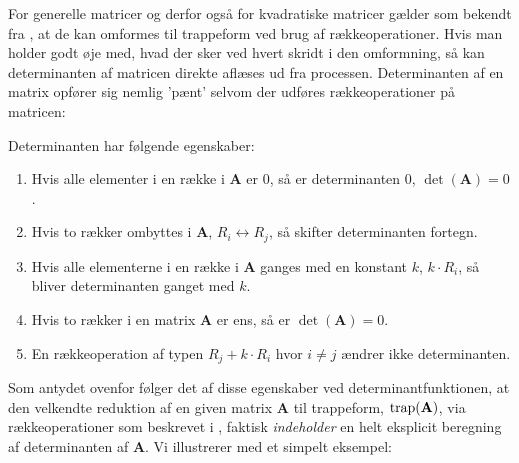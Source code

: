 For generelle matricer og derfor også for kvadratiske matricer gælder som bekendt fra , at de kan omformes til trappeform ved brug af rækkeoperationer.
Hvis man holder godt øje med, hvad der sker ved hvert skridt i den omformning,
så kan determinanten af matricen direkte aflæses ud fra processen. Determinanten af en matrix opfører sig nemlig 'pænt' selvom der udføres rækkeoperationer på matricen:


\begin{theorem} \label{tn5.thmEgenskaberDeterm}
Determinanten har følgende egenskaber:
\begin{enumerate}
\item Hvis alle elementer i en række i $\mathbf{A}$ er $0$, så er determinanten $0$, $\det(\mathbf{A}) = 0$.
\item Hvis to rækker ombyttes i $\mathbf{A}$, $R_{i} \leftrightarrow R_{j}$,  så skifter determinanten fortegn.
\item Hvis alle elementerne i en række i $\mathbf{A}$ ganges med en konstant $k$, $k \cdot R_{i}$,  så bliver determinanten ganget med $k$.
\item Hvis to rækker i en matrix $\mathbf{A}$ er ens, så er $\det(\mathbf{A}) = 0$.
\item En rækkeoperation af typen $R_{j} + k \cdot R_{i}$ hvor $i \neq j$ ændrer ikke determinanten.
\end{enumerate}
\end{theorem}


Som antydet ovenfor følger det af disse egenskaber ved determinantfunktionen, at den velkendte reduktion af en given matrix $\mathbf{A}$ til trappeform, $\mathrm{trap}(\mathbf{A})$, via rækkeoperationer som beskrevet i , faktisk {\textit{indeholder}} en helt eksplicit beregning af determinanten af $\mathbf{A}$. Vi illustrerer med et simpelt eksempel:

